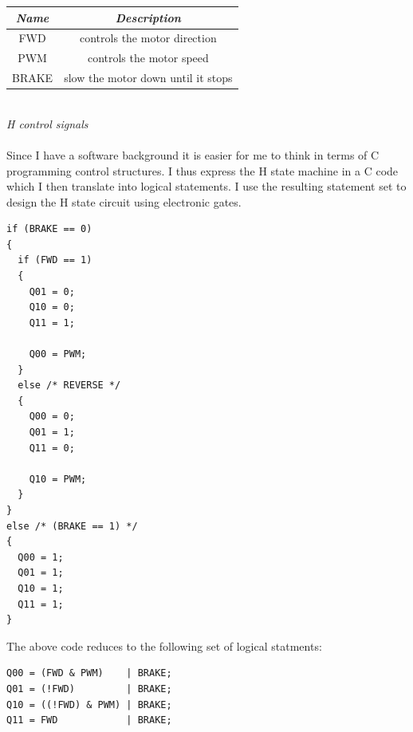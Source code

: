 \documentclass[12pt]{article}
\begin{document}
\smallskip
\begin{center}
  \begin{tabular}{|c|c|}
    \hline
    \textit{Name} & \textit{Description} \\
    \hline
    FWD & controls the motor direction \\
    \hline
    PWM & controls the motor speed \\
    \hline
    BRAKE & slow the motor down until it stops \\
    \hline
  \end{tabular}
  \\
  \smallskip
  \tiny{\textit{H control signals}}
\end{center}

\paragraph{} Since I have a software background it is easier for me to think in terms of C programming control
structures. I thus express the H state machine in a C code which I then translate into logical statements. I
use the resulting statement set to design the H state circuit using electronic gates.

\smallskip
\begin{tiny}
  \lstset{language=C}
  \begin{lstlisting}[frame=tb]
if (BRAKE == 0)
{
  if (FWD == 1)
  {
    Q01 = 0;
    Q10 = 0;
    Q11 = 1;

    Q00 = PWM;
  }
  else /* REVERSE */
  {
    Q00 = 0;
    Q01 = 1;
    Q11 = 0;

    Q10 = PWM;
  }
}
else /* (BRAKE == 1) */
{
  Q00 = 1;
  Q01 = 1;
  Q10 = 1;
  Q11 = 1;
}
  \end{lstlisting}
\end{tiny}

\smallskip
The above code reduces to the following set of logical statments:
\begin{tiny}
  \lstset{language=C}
  \begin{lstlisting}[frame=tb]
Q00 = (FWD & PWM)    | BRAKE;
Q01 = (!FWD)         | BRAKE;
Q10 = ((!FWD) & PWM) | BRAKE;
Q11 = FWD            | BRAKE;
  \end{lstlisting}
\end{tiny}
\end{document}
